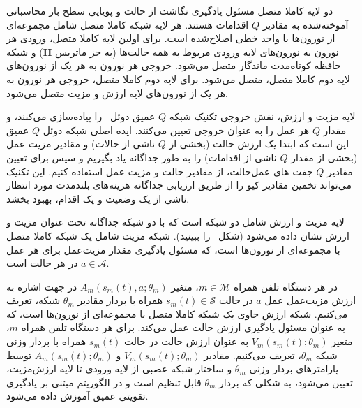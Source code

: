 
دو لایه کاملا متصل مسئول یادگیری نگاشت از حالت و پویایی سطح بار محاسباتی آموخته‌شده به مقادیر $Q$ اقدامات هستند. هر لایه شبکه کاملا متصل شامل مجموعه‌ای از نورون‌ها با واحد خطی اصلاح‌شده است. برای اولین لایه کاملا متصل، ورودی هر نورون به نورون‌های لایه ورودی مربوط به همه حالت‌ها (به جز ماتریس $\textbf{H}$) و شبکه حافظه کوتاه‌مدت ماندگار متصل می‌شود. خروجی هر نورون به هر یک از نورون‌های لایه دوم کاملا متصل، متصل می‌شود. برای لایه دوم کاملا متصل، خروجی هر نورون به هر یک از نورون‌های لایه ارزش و مزیت متصل می‌شود.



لایه مزیت و ارزش، نقش خروجی تکنیک شبکه $Q$ عمیق دوئل~\cite{wang2016dueling} را پیاده‌سازی می‌کنند، و مقدار $Q$ هر عمل را به عنوان خروجی تعیین می‌کنند. ایده اصلی شبکه دوئل $Q$ عمیق این است که ابتدا یک ارزش حالت (بخشی از  $Q$ ناشی از حالات) و مقادیر مزیت عمل (بخشی از مقدار $Q$ ناشی از اقدامات) را به طور جداگانه یاد بگیریم و سپس برای تعیین مقادیر $Q$ جفت های عمل‌حالت، از مقادیر حالت و مزیت عمل استفاده کنیم. این تکنیک می‌تواند تخمین مقادیر کیو را از طریق ارزیابی جداگانه هزینه‌های بلندمدت مورد انتظار ناشی از یک وضعیت و یک اقدام، بهبود بخشد. 

لایه مزیت و ارزش شامل دو شبکه است که با دو شبکه جداگانه تحت عنوان مزیت و ارزش نشان داده می‌شود (شکل~ را ببینید). شبکه مزیت شامل یک شبکه کاملا متصل با مجموعه‌ای از نورون‌ها است، که مسئول یادگیری مقدار مزیت‌عمل برای هر عمل $a \in \mathcal{A}$ در هر حالت است.






%



در هر دستگاه تلفن همراه $m \in \mathcal{M}$، متغیر $A_m(s_m(t), a;\theta_m)$ در جهت اشاره به ارزش مزیت‌عمل عمل $a$ در حالت  $s_m(t) \in \mathcal{S}$ همراه با بردار مقادیر $\theta_m$ شبکه، تعریف می‌کنیم. شبکه ارزش حاوی یک شبکه کاملا متصل با مجموعه‌ای از نورون‌ها است، که به عنوان مسئول یادگیری ارزش حالت عمل می‌کند. برای هر دستگاه تلفن همراه $m$، متغیر $V_m(s_m(t);\theta_m)$ به عنوان ارزش حالت در حالت $s_m(t)$ همراه با بردار وزنی شبکه $\theta_m$، تعریف می‌کنیم. مقادیر $V_m(s_m(t);\theta_m)$ و $A_m(s_m(t);\theta_m)$ توسط پارامترهای بردار وزنی $\theta_m$ و ساختار شبکه عصبی از لایه ورودی تا لایه ارزش‌مزیت، تعیین می‌شود، به شکلی که بردار $\theta_m$ قابل تنظیم است و در الگوریتم مبتنی بر یادگیری تقویتی عمیق آموزش داده می‌شود.

